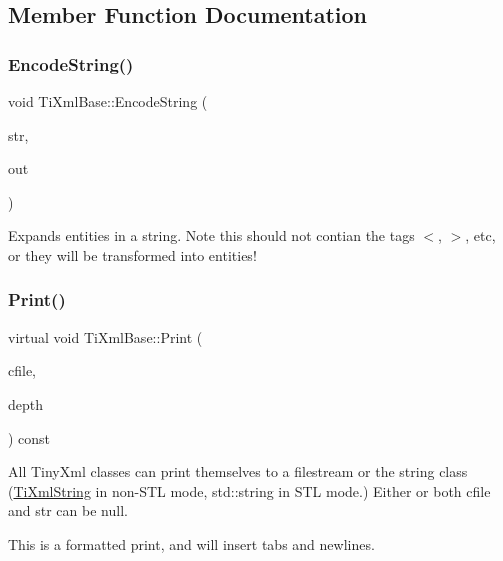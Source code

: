\subsection{Member Function Documentation}
\mbox{\label{class_ti_xml_base_a32ed202562b58de64c7d799ca3c9db98}} 
\subsubsection{\texorpdfstring{Encode\+String()}{EncodeString()}}
{\footnotesize\ttfamily void Ti\+Xml\+Base\+::\+Encode\+String (\begin{DoxyParamCaption}\item[{const T\+I\+X\+M\+L\+\_\+\+S\+T\+R\+I\+NG \&}]{str,  }\item[{T\+I\+X\+M\+L\+\_\+\+S\+T\+R\+I\+NG $\ast$}]{out }\end{DoxyParamCaption})\hspace{0.3cm}{\ttfamily [static]}}

Expands entities in a string. Note this should not contian the tag\textquotesingle{}s \textquotesingle{}$<$\textquotesingle{}, \textquotesingle{}$>$\textquotesingle{}, etc, or they will be transformed into entities! \mbox{\label{class_ti_xml_base_a0de56b3f2ef14c65091a3b916437b512}} 
\subsubsection{\texorpdfstring{Print()}{Print()}}
{\footnotesize\ttfamily virtual void Ti\+Xml\+Base\+::\+Print (\begin{DoxyParamCaption}\item[{F\+I\+LE $\ast$}]{cfile,  }\item[{int}]{depth }\end{DoxyParamCaption}) const\hspace{0.3cm}{\ttfamily [pure virtual]}}

All Tiny\+Xml classes can print themselves to a filestream or the string class (\hyperlink{class_ti_xml_string}{Ti\+Xml\+String} in non-\/\+S\+TL mode, std\+::string in S\+TL mode.) Either or both cfile and str can be null.

This is a formatted print, and will insert tabs and newlines.

